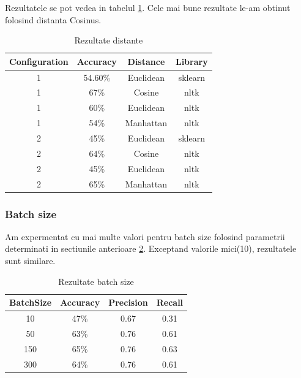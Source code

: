\documentclass{article}
\begin{document}
Rezultatele se pot vedea in tabelul \ref{tab:resDist}. Cele mai bune rezultate le-am obtinut folosind distanta Cosinus.
\begin{table}[h!]
  \begin{center}
    \caption{Rezultate distante}
    \label{tab:resDist}
    \begin{tabular}{c|c|c|c}
      \textbf{Configuration} & \textbf{Accuracy} & \textbf{Distance} & \textbf{Library} \\
      \hline
      1 & 54.60\% & Euclidean & sklearn \\
      1 & 67\% & Cosine & nltk \\
      1 & 60\% & Euclidean & nltk \\
      1 & 54\% & Manhattan & nltk \\
      2 & 45\% & Euclidean & sklearn \\
      2 & 64\% & Cosine & nltk \\
      2 & 45\% & Euclidean & nltk \\
      2 & 65\% & Manhattan & nltk \\
      \end{tabular}
  \end{center}
\end{table}

\subsubsection{Batch size}
Am expermentat cu mai multe valori pentru batch size folosind parametrii determinati in sectiunile anterioare \ref{tab:resBatch}. Exceptand valorile mici(10), rezultatele sunt similare.  
\begin{table}[h!]
  \begin{center}
    \caption{Rezultate batch size}
    \label{tab:resBatch}
    \begin{tabular}{c|c|c|c}
      \textbf{BatchSize} & \textbf{Accuracy} & \textbf{Precision} & \textbf{Recall} \\
      \hline
      10 & 47\% & 0.67 & 0.31 \\
      50 & 63\% & 0.76 & 0.61 \\
     150 & 65\% & 0.76 & 0.63 \\
     300 & 64\% & 0.76 & 0.61 \\
      \end{tabular}
  \end{center}
\end{table}
\end{document}

